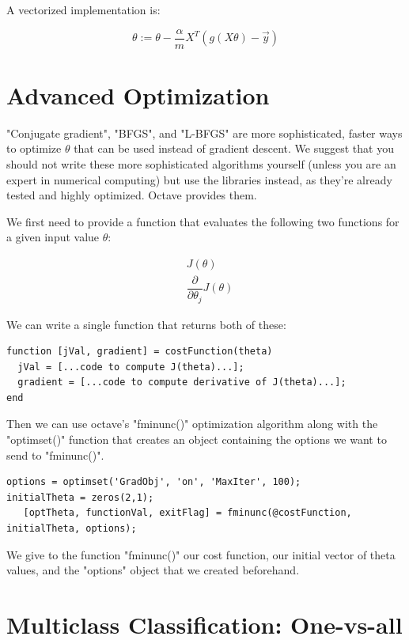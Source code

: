 \documentclass[10pt,a4paper,UTF8]{article}
\begin{document}
A vectorized implementation is:

\begin{equation}
\label{eq:3}
\theta := \theta - \frac{\alpha}{m} X^{T} (g(X \theta ) - \vec{y})
\end{equation}
\section{Advanced Optimization}
\label{sec:orgb818a3c}


"Conjugate gradient", "BFGS", and "L-BFGS" are more sophisticated, faster ways to optimize \(\theta\) that can be used instead of gradient descent. We suggest that you should not write these more sophisticated algorithms yourself (unless you are an expert in numerical computing) but use the libraries instead, as they're already tested and highly optimized. Octave provides them.

We first need to provide a function that evaluates the following two functions for a given input value \(\theta\):

\begin{align*} & J(\theta) \\ & \dfrac{\partial}{\partial \theta_j}J(\theta)\end{align*}

We can write a single function that returns both of these:

\begin{verbatim}
function [jVal, gradient] = costFunction(theta)
  jVal = [...code to compute J(theta)...];
  gradient = [...code to compute derivative of J(theta)...];
end
\end{verbatim}

Then we can use octave's "fminunc()" optimization algorithm along with the "optimset()" function that creates an object containing the options we want to send to "fminunc()".

\begin{verbatim}
options = optimset('GradObj', 'on', 'MaxIter', 100);
initialTheta = zeros(2,1);
   [optTheta, functionVal, exitFlag] = fminunc(@costFunction, initialTheta, options);
\end{verbatim}

We give to the function "fminunc()" our cost function, our initial vector of theta values, and the "options" object that we created beforehand.
\section{Multiclass Classification: One-vs-all}
\label{sec:org23efb37}
\end{document}

